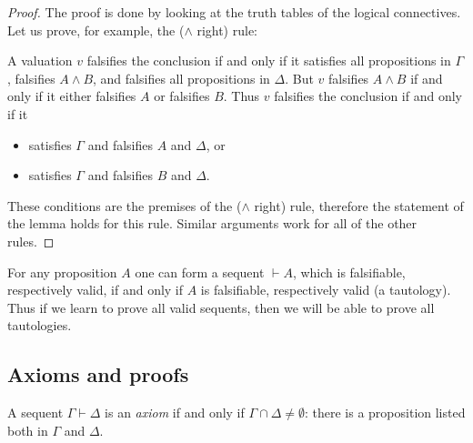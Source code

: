 \begin{page}
\setcounter{section}{2}
\setcounter{subsection}{5}
\setcounter{dfn}{9}
\label{portion:509}

\begin{proof}
The proof is done by looking at the truth tables of the logical connectives.
Let us prove, for example, the ($\wedge$ right) rule:
\begin{prooftree}
\end{prooftree}
A valuation $v$ falsifies the conclusion if and only if
it satisfies all propositions in $\Gamma$, falsifies $A \wedge B$, and falsifies all propositions in $\Delta$.
But $v$ falsifies $A \wedge B$ if and only if it either falsifies $A$ or falsifies $B$.
Thus $v$ falsifies the conclusion if and only if it
\begin{itemize}
\item
satisfies $\Gamma$ and falsifies $A$ and $\Delta$, or
\item
satisfies $\Gamma$ and falsifies $B$ and $\Delta$.
\end{itemize}
These conditions are the premises of the ($\wedge$ right) rule, therefore the statement of the lemma holds for this rule.
Similar arguments work for all of the other rules.
\end{proof}

For any proposition $A$ one can form a sequent $\vdash A$, which is falsifiable, respectively valid, if and only if
$A$ is falsifiable, respectively valid (a tautology).
Thus if we learn to prove all valid sequents, then we will be able to prove all tautologies.




\end{page}

\begin{page}
\setcounter{section}{2}
\setcounter{subsection}{5}
\setcounter{dfn}{9}
\label{portion:511}

\subsection{Axioms and proofs}
\label{sec:AxiomsProofs}

\end{page}

\begin{page}
\setcounter{section}{2}
\setcounter{subsection}{5}
\setcounter{dfn}{10}
\label{portion:513}

\begin{dfn}
A sequent $\Gamma \vdash \Delta$ is an \emph{axiom} if and only if $\Gamma \cap \Delta \ne \emptyset$:
there is a proposition listed both in $\Gamma$ and $\Delta$.
\end{dfn}

\end{page}


